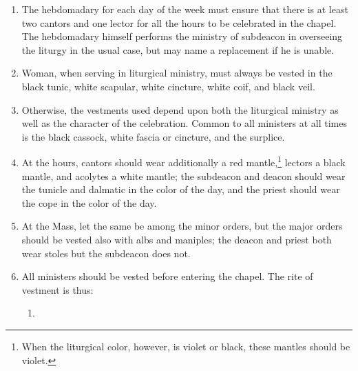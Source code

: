 \begin{enumerate}
			\item The hebdomadary for each day of the week must ensure that there is at least two cantors and one lector for all the hours to be celebrated in the chapel. The hebdomadary himself performs the ministry of subdeacon in overseeing the liturgy in the usual case, but may name a replacement if he is unable.
			
		
			\item Woman, when serving in liturgical ministry, must always be vested in the black tunic, white scapular, white cincture, white coif, and black veil.
			
			\item Otherwise, the vestments used depend upon both the liturgical ministry as well as the character of the celebration. Common to all ministers at all times is the black cassock, white fascia or cincture, and the surplice.
			
			\item At the hours, cantors should wear additionally a red mantle,\footnote{When the liturgical color, however, is violet or black, these mantles should be violet.} lectors a black mantle, and acolytes a white mantle; the subdeacon and deacon should wear the tunicle and dalmatic in the color of the day, and the priest should wear the cope in the color of the day.
			
			\item At the Mass, let the same be among the minor orders, but the major orders should be vested also with albs and maniples; the deacon and priest both wear stoles but the subdeacon does not. 
			
			\item All ministers should be vested before entering the chapel. The rite of vestment is thus:
			
				\begin{enumerate}
					\item 
				\end{enumerate}
			
		\end{enumerate}
